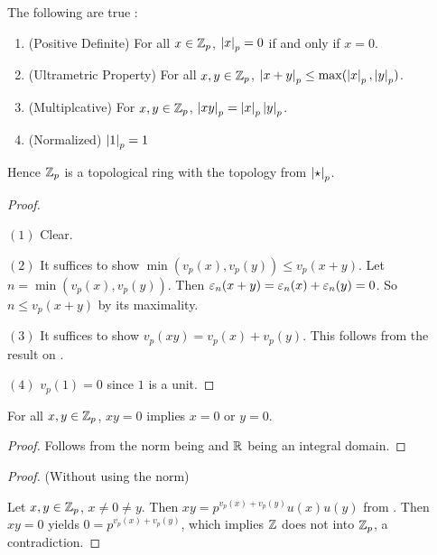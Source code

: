 \begin{prop}
  
  The following are true : 
  \begin{enumerate}
    \item (Positive Definite) 
    For all $x \in \mathbb{Z}_p$, $\left\vert x \right\vert_p = 0$ if and only if $x = 0$. 
    \item (Ultrametric Property) 
    For all $x, y \in \mathbb{Z}_p$, 
    $\left\vert x + y \right\vert_p \leq \max(\left\vert x \right\vert_p,\left\vert y \right\vert_p)$. 
    \item (Multiplcative)
    For $x, y \in \mathbb{Z}_p$, 
    $\left\vert x y \right\vert_p = \left\vert x \right\vert_p \left\vert y \right\vert_p$. 
    \item (Normalized)
    $\left\vert 1 \right\vert_p = 1$
  \end{enumerate}
  Hence $\mathbb{Z}_p$ is a topological ring with the topology from $\left\vert \star \right\vert_p$. 
\end{prop}
\begin{proof}~
  
  $(1)$ Clear. 

  $(2)$ It suffices to show $\min(v_p(x),v_p(y)) \leq v_p(x + y)$. 
  Let $n = \min(v_p(x),v_p(y))$. 
  Then $\varepsilon_n(x + y) = \varepsilon_n(x) + \varepsilon_n(y) = 0$.
  So $n \leq v_p(x + y)$ by its maximality. 

  $(3)$ It suffices to show $v_p(x y) = v_p(x) + v_p(y)$. 
  This follows from the result on 
  .

  $(4)$ $v_p(1) = 0$ since $1$ is a unit. 
\end{proof}

\begin{prop}
  
  For all $x, y \in \mathbb{Z}_p$, $x y = 0$ implies $x = 0$ or $y = 0$. 
\end{prop}
\begin{proof}
  Follows from the norm being 
  and $\mathbb{R}$ being an integral domain. 
\end{proof}
\begin{proof}(Without using the norm)

  Let $x, y \in \mathbb{Z}_p$, $x \neq 0 \neq y$. 
  Then $x y = p^{v_p(x) + v_p(y)} u(x) u(y)$ from 
  . 
  Then $x y = 0$ yields $0 = p^{v_p(x) + v_p(y)}$, 
  which implies $\mathbb{Z}$ does not  into $\mathbb{Z}_p$,
  a contradiction. 
\end{proof}

